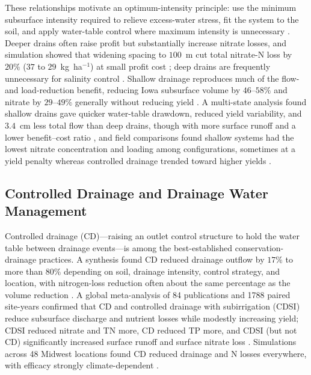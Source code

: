 \documentclass[11pt]{article}
\begin{document}
These relationships motivate an optimum-intensity principle: use the minimum
subsurface intensity required to relieve excess-water stress, fit the system to
the soil, and apply water-table control where maximum intensity is unnecessary
\parencite{Breve1998}. Deeper drains often raise profit but substantially
increase nitrate losses, and simulation showed that widening spacing to $100$~m
cut total nitrate-N loss by $20\%$ ($37$ to $29$~kg~ha$^{-1}$) at small profit
cost \parencite{ElSadek2002b,Breve1998}; deep drains are frequently unnecessary
for salinity control \parencite{Ritzema2011}. Shallow drainage reproduces much
of the flow- and load-reduction benefit, reducing Iowa subsurface volume by
$46$--$58\%$ and nitrate by $29$--$49\%$ generally without reducing yield
\parencite{Helmers2012,Schott2017}. A multi-state analysis found shallow drains
gave quicker water-table drawdown, reduced yield variability, and $3.4$~cm less
total flow than deep drains, though with more surface runoff and a lower
benefit--cost ratio \parencite{Ghane2021b}, and field comparisons found shallow
systems had the lowest nitrate concentration and loading among configurations,
sometimes at a yield penalty whereas controlled drainage trended toward higher
yields \parencite{Smith2019,Smith2011b}.

\subsection{Controlled Drainage and Drainage Water Management}

Controlled drainage (CD)---raising an outlet control structure to hold the
water table between drainage events---is among the best-established
conservation-drainage practices. A synthesis found CD reduced drainage outflow
by $17\%$ to more than $80\%$ depending on soil, drainage intensity, control
strategy, and location, with nitrogen-loss reduction often about the same
percentage as the volume reduction \parencite{Skaggs2010}. A global
meta-analysis of 84 publications and 1788 paired site-years confirmed that CD
and controlled drainage with subirrigation (CDSI) reduce subsurface discharge
and nutrient losses while modestly increasing yield; CDSI reduced nitrate and
TN more, CD reduced TP more, and CDSI (but not CD) significantly increased
surface runoff and surface nitrate loss \parencite{Wu2025}. Simulations across
48 Midwest locations found CD reduced drainage and N losses everywhere, with
efficacy strongly climate-dependent \parencite{Youssef2018}.
\end{document}
